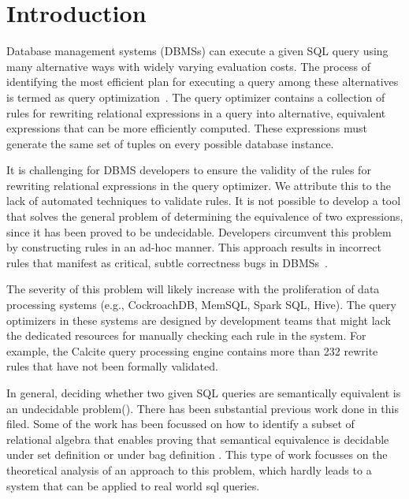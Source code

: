 \section{Introduction}\label{sec:introduction}

Database management systems (DBMSs) can execute a given SQL query using many
alternative ways with widely varying evaluation costs.
The process of identifying the most efficient plan for executing a query among
these alternatives is termed as query optimization~\cite{ramakrishnan02}. 
The query optimizer contains a collection of rules for rewriting relational
expressions in a query into alternative, equivalent expressions that can be more
efficiently computed. These expressions must generate the same set of tuples on
every possible database instance.

It is challenging for DBMS developers to ensure the validity of the rules for
rewriting relational expressions in the query optimizer. We attribute this to
the lack of automated techniques to validate rules. It is not possible to
develop a tool that solves the general problem of determining the equivalence of 
two expressions, since it has been proved to be undecidable.
Developers circumvent this problem by constructing rules in an ad-hoc manner.
This approach results in incorrect rules that manifest as critical, subtle
correctness bugs in DBMSs~\cite{ganski87}.

The severity of this problem will likely increase with the proliferation of 
data processing systems (e.g., CockroachDB, MemSQL, Spark SQL, Hive). 
The query optimizers in these systems are designed by development teams that
might lack the dedicated resources for manually checking each rule in the
system. For example, the Calcite query processing engine contains more than 232
rewrite rules that have not been formally validated.

In general, deciding whether two given SQL queries are semantically equivalent
is an undecidable problem().
There has been substantial previous work done in this filed.
Some of the work has been focussed on how to identify a subset of relational
algebra that enables proving that semantical equivalence is decidable under set
definition  or under bag definition .
This type of work focusses on the theoretical analysis of an approach to this
problem, which hardly leads to a system that can be applied to real world sql
queries.

